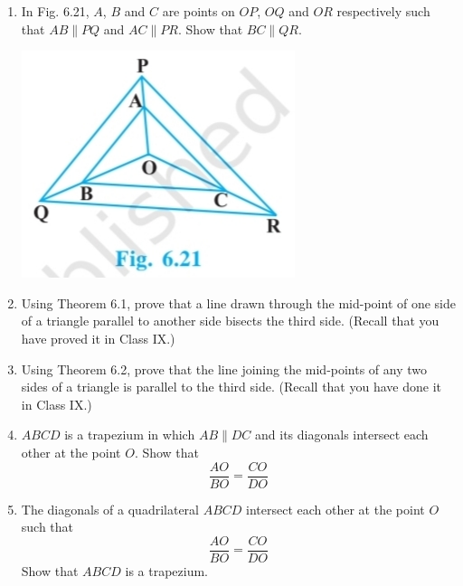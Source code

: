 \documentclass[a4paper,12pt]{article}
\begin{document}
\begin{enumerate}
\vspace{1em}

\item 
\begin{minipage}[t]{0.6\textwidth}
In Fig. 6.21, $A$, $B$ and $C$ are points on $OP$, $OQ$ and $OR$ respectively  
such that $AB \parallel PQ$ and $AC \parallel PR$. Show that $BC \parallel QR$.
\end{minipage}%
\hfill
\begin{minipage}[t]{0.35\textwidth}
\includegraphics[width=\linewidth]{a5.jpg}
\end{minipage}

\vspace{1em}

\item Using Theorem 6.1, prove that a line drawn through  
the mid-point of one side of a triangle parallel to another side  
bisects the third side. (Recall that you have proved it in Class IX.)

\vspace{1em}

\item Using Theorem 6.2, prove that the line joining the  
mid-points of any two sides of a triangle is parallel to  
the third side. (Recall that you have done it in Class IX.)

\vspace{1em}

\item $ABCD$ is a trapezium in which $AB \parallel DC$ and its  
diagonals intersect each other at the point $O$. Show that  
$$
\frac{AO}{BO} = \frac{CO}{DO}
$$

\vspace{1em}

\item The diagonals of a quadrilateral $ABCD$ intersect each  
other at the point $O$ such that  
$$
\frac{AO}{BO} = \frac{CO}{DO}
$$
Show that $ABCD$ is a trapezium.

\end{enumerate}
\end{document}

